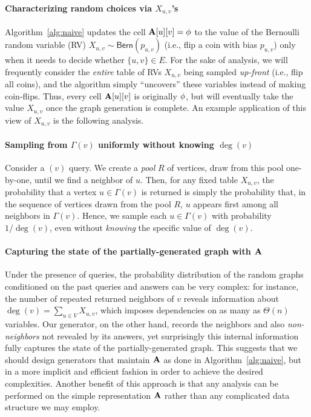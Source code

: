\paragraph*{Characterizing random choices via $X_{u,v}$'s}
Algorithm~\ref{alg:naive} updates the cell $\mathbf{A}[u][v] = \phi$ to the value of the Bernoulli random variable (RV) $X_{u,v} \sim \mathsf{Bern}(p_{u,v})$
(i.e., flip a coin with bias $p_{u,v}$) only when it needs to decide whether $\{u,v\}\in E$.
For the sake of analysis, we will frequently consider the \emph{entire} table of RVs $X_{u,v}$ being sampled \emph{up-front} (i.e., flip all coins),
and the algorithm simply ``uncovers'' these variables instead of making coin-flips.
Thus, every cell $\mathbf{A}[u][v]$ is originally $\phi$, but will eventually take the value $X_{u,v}$ once the graph generation is complete.
An example application of this view of $X_{u,v}$ is the following analysis.

\paragraph*{Sampling from $\Gamma(v)$ uniformly without knowing $\deg(v)$}
Consider a $(v)$ query.
We create a \emph{pool} $R$ of vertices, draw from this pool one-by-one, until we find a neighbor of $u$.
Then, for any fixed table $X_{u,v}$, the probability that a vertex $u \in \Gamma(v)$ is returned is simply the probability that,
in the sequence of vertices drawn from the pool $R$, $u$ appears first among all neighbors in $\Gamma(v)$.
Hence, we sample each $u \in \Gamma(v)$ with probability $1/\deg(v)$, even without \emph{knowing} the specific value of $\deg(v)$.

\paragraph*{Capturing the state of the partially-generated graph with $\mathbf{A}$}
Under the presence of  queries, the probability distribution of the random graphs conditioned on the past queries and answers
can be very complex: for instance,
the number of repeated returned neighbors of $v$ reveals information about $\deg(v) = \sum_{u\in V}X_{u,v}$,
which imposes dependencies on as many as $\Theta(n)$ variables.
Our generator, on the other hand, records the neighbors and also \emph{non-neighbors} not revealed by its answers,
yet surprisingly this internal information fully captures the state of the partially-generated graph.
This suggests that we should design generators that maintain $\mathbf{A}$ as done in Algorithm~\ref{alg:naive},
but in a more implicit and efficient fashion in order to achieve the desired complexities.
Another benefit of this approach is that any analysis can be performed on the simple representation $\mathbf{A}$
rather than any complicated data structure we may employ.

